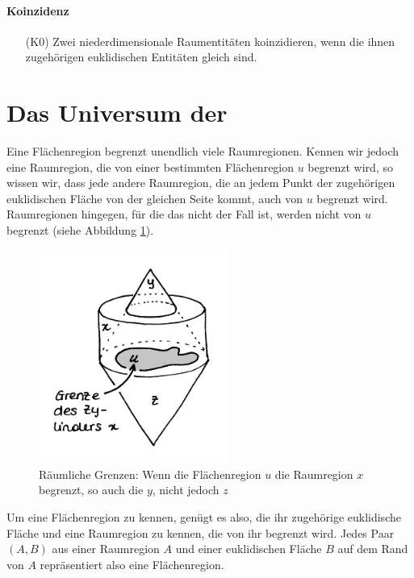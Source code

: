 	\paragraph{Koinzidenz} 
	\begin{itemize}
	    \item[(K0)] Zwei niederdimensionale Raumentitäten koinzidieren, wenn die ihnen zugehörigen euklidischen Entitäten gleich sind.
	\end{itemize}

	
    \section{Das Universum der \strukt}\label{sec:universum}

        Eine Flächenregion begrenzt unendlich viele Raumregionen.
        Kennen wir jedoch eine Raumregion, die von einer bestimmten Flächenregion $u$ begrenzt wird, so wissen wir, dass jede andere Raumregion, die an jedem Punkt der zugehörigen euklidischen Fläche von der gleichen Seite kommt, auch von $u$ begrenzt wird.
        Raumregionen hingegen, für die das nicht der Fall ist, werden nicht von $u$ begrenzt (siehe Abbildung \ref{fig:sb}).
%
        \begin{figure}[ht]
            \centering
            \includegraphics[height=7cm]{abb/sb.png}
            \caption[Räumliche Grenzen]{Räumliche Grenzen: Wenn die Flächenregion $u$ die Raumregion $x$ begrenzt, so auch die $y$, nicht jedoch $z$}
            \label{fig:sb}
        \end{figure}
%
        Um eine Flächenregion zu kennen, genügt es also, die ihr zugehörige euklidische Fläche und eine Raumregion zu kennen, die von ihr begrenzt wird.
        Jedes Paar $(A,B)$ aus einer Raumregion $A$ und einer euklidischen Fläche $B$ auf dem Rand von $A$ repräsentiert also eine Flächenregion.


